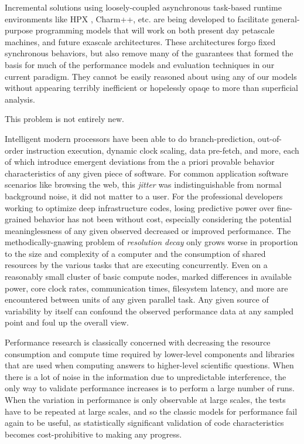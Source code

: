 Incremental solutions using loosely-coupled asynchronous task-based
runtime environments like HPX \cite{kaiser2014hpx}, Charm++, etc. are
being developed to facilitate general-purpose programming models that
will work on both present day petascale machines, and future exascale
architectures.
%
These architectures forgo fixed synchronous behaviors, but also remove
many of the guarantees that formed the basis for much of the
performance models and evaluation techniques in our current paradigm.
%
They cannot be easily reasoned about using any of our models without
appearing terribly inefficient or hopelessly opaqe to more than
superficial analysis.

This problem is not entirely new.

Intelligent modern processors have been able to do branch-prediction,
out-of-order instruction execution, dynamic clock scaling, data
pre-fetch, and more, each of which introduce emergent deviations from
the a priori provable behavior characteristics of any given piece of
software.
%
For common application software scenarios like browsing the web, this
\textit{jitter} was indistinguishable from normal background
noise, it did not matter to a user.
%
For the professional developers working to optimize deep
infrastructure codes, losing predictive power over fine-grained
behavior has not been without cost, especially considering the
potential meaninglessness of any given observed decreased or improved
performance.
%
The methodically-gnawing problem of \textit{resolution decay} only
grows worse in proportion to the size and complexity of a computer and
the consumption of shared resources by the various tasks that are
executing concurrently.
%
Even on a reasonably small cluster of basic compute nodes, marked
differences in available power, core clock rates, communication times,
filesystem latency, and more are encountered between units of any
given parallel task.
%
Any given source of variability by itself can confound the observed
performance data at any sampled point and foul up the overall view.

Performance research is classically concerned with decreasing the
resource consumption and compute time required by lower-level
components and libraries that are used when computing answers to
higher-level scientific questions.
%
When there is a lot of noise in the information due to unpredictable
interference, the only way to validate performance increases is to
perform a large number of runs.
%
When the variation in performance is only observable at large scales,
the tests have to be repeated at large scales, and so the classic
models for performance fail again to be useful, as statistically
significant validation of code characteristics becomes
cost-prohibitive to making any progress.

